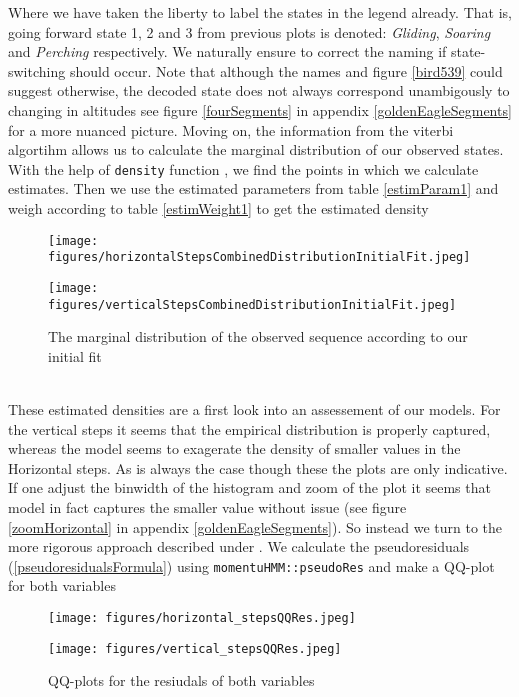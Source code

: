 Where we have taken the liberty to label the states in the legend already. That is,
going forward state 1, 2 and 3 from previous plots is denoted: \textit{Gliding}, \textit{Soaring} and \textit{Perching} respectively. We naturally ensure to correct the naming if state-switching should occur. Note that although the names and figure \ref{bird539} could suggest otherwise, the decoded state does not always correspond unambigously to changing in altitudes see figure \ref{fourSegments} in appendix \ref{goldenEagleSegments} for a more nuanced picture.
Moving on, the information from the viterbi algortihm allows us to calculate the marginal distribution of our observed states. With the help of \texttt{density} function \cite{RLang}, we find the points in which we calculate estimates. Then we use the estimated parameters from table \ref{estimParam1} and weigh according to table \ref{estimWeight1} to get the estimated density
\begin{figure}[ht]
    \centering
    \begin{minipage}[b]{0.49\textwidth}
      \texttt{[image: figures/horizontalStepsCombinedDistributionInitialFit.jpeg]}
    \end{minipage}
    \hfill
    \begin{minipage}[b]{0.49\textwidth}
      \texttt{[image: figures/verticalStepsCombinedDistributionInitialFit.jpeg]}
    \end{minipage}
    \caption{The marginal distribution of the observed sequence according to our initial fit}
    \label{combinedDensityPlotsInitialFit}
\end{figure}\\
These estimated densities are a first look into an assessement of our models. For the vertical steps it seems that the empirical distribution is properly captured, whereas the model seems to exagerate the density of smaller values in the Horizontal steps. As is always the case though these the plots are only indicative. If one adjust the binwidth of the histogram and zoom of the plot it seems that model in fact captures the smaller value without issue (see figure \ref{zoomHorizontal} in appendix \ref{goldenEagleSegments}). So instead we turn to the more rigorous approach described under . We calculate the pseudoresiduals (\ref{pseudoresidualsFormula}) using \texttt{momentuHMM::pseudoRes} and make a QQ-plot for both variables
\begin{figure}[ht]
    \centering
    \begin{minipage}[b]{0.49\textwidth}
      \texttt{[image: figures/horizontal\_stepsQQRes.jpeg]}
    \end{minipage}
    \hfill
    \begin{minipage}[b]{0.49\textwidth}
      \texttt{[image: figures/vertical\_stepsQQRes.jpeg]}
    \end{minipage}
    \caption{QQ-plots for the resiudals of both variables}
    \label{combinedQQPlots}
\end{figure}\\
